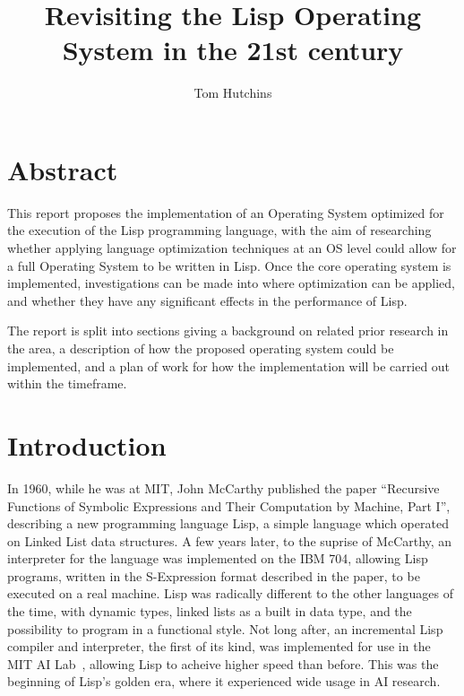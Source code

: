 \documentclass{article}
\begin{document}
  \title{Revisiting the Lisp Operating System in the 21st century}
  \author{Tom Hutchins}

  \maketitle

  \section{Abstract}
  This report proposes the implementation of an Operating System optimized for the execution of the Lisp programming language, with the aim of researching whether applying language optimization techniques at an OS level could allow for a full Operating System to be written in Lisp. Once the core operating system is implemented, investigations can be made into where optimization can be applied, and whether they have any significant effects in the performance of Lisp.
  \par
  
  The report is split into sections giving a background on related prior research in the area, a description of how the proposed operating system could be implemented, and a plan of work for how the implementation will be carried out within the timeframe.

  \section{Introduction}  
  In 1960, while he was at MIT, John McCarthy published the paper ``Recursive Functions of Symbolic Expressions and Their Computation by Machine, Part I''\cite{MccarthyJohn1960Rfos}, describing a new programming language Lisp, a simple language which operated on Linked List data structures. A few years later, to the suprise of McCarthy, an interpreter for the language was implemented on the IBM 704, allowing Lisp programs, written in the S-Expression format described in the paper, to be executed on a real machine. Lisp was radically different to the other languages of the time, with dynamic types, linked lists as a built in data type, and the possibility to program in a functional style. Not long after, an incremental Lisp compiler and interpreter, the first of its kind, was implemented for use in the MIT AI Lab~\cite{ai-memo-39}, allowing Lisp to acheive higher speed than before. This was the beginning of Lisp's golden era, where it experienced wide usage in AI research.
  \par
  
\end{document}

